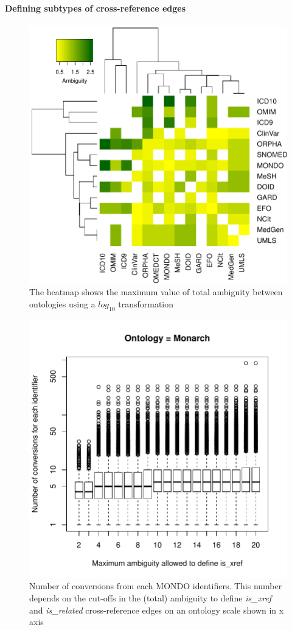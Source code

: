 \documentclass[9pt,a4paper,]{extarticle}
\begin{document}
\hypertarget{defining-subtypes-of-cross-reference-edges}{%
\paragraph{Defining subtypes of cross-reference edges}\label{defining-subtypes-of-cross-reference-edges}}



\begin{figure}

{\centering \includegraphics[width=0.8\linewidth,height=0.5\textheight]{DODO-F1000-publication_files/figure-latex/heatmapAmbiguity-1} 

}

\caption{The heatmap shows the maximum value of total ambiguity between ontologies using a \(log_{10}\) transformation}\label{fig:heatmapAmbiguity}
\end{figure}



\begin{figure}

{\centering \includegraphics[width=0.5\linewidth,height=0.2\textheight]{DODO-F1000-publication_files/figure-latex/boxplotAmbiguity-1} 

}

\caption{Number of conversions from each MONDO identifiers. This number depends on the cut-offs in the (total) ambiguity to define \emph{is\_xref} and \emph{is\_related} cross-reference edges on an ontology scale shown in x axis}\label{fig:boxplotAmbiguity}
\end{figure}
\end{document}
